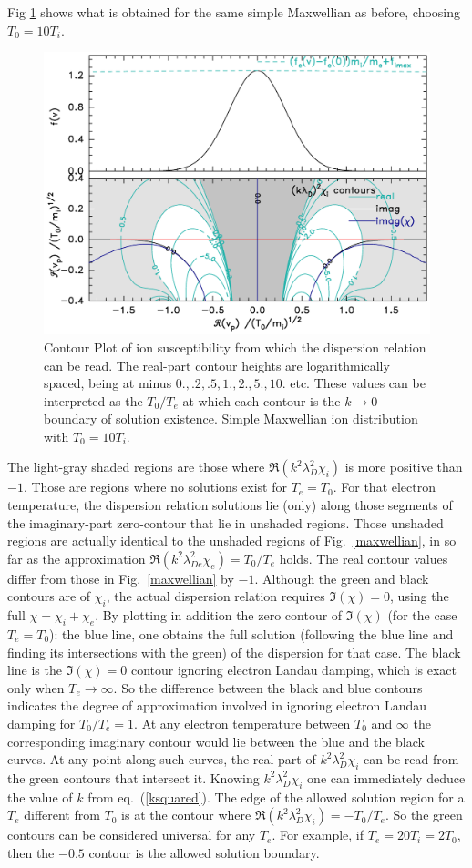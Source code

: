 \documentclass[12pt]{article}
\begin{document}
Fig \ref{maxwellion} shows what is obtained for the same
simple Maxwellian as before, choosing $T_0=10T_i$.
\begin{figure}[ht]
  \center\includegraphics[width=0.7\hsize]{maxwellion}\endcenter
  \caption{Contour Plot of ion susceptibility from which the
    dispersion relation can be read. The real-part contour heights are
    logarithmically spaced, being at minus $0.,.2,.5,1.,2.,5.,10.$
    etc. These values can be interpreted as the $T_0/T_e$ at which
    each contour is the $k\to 0$ boundary of solution existence.
    Simple Maxwellian ion distribution with
    $T_0=10T_i$.\label{maxwellion}}
\end{figure}
The light-gray shaded regions are those where
$\Re(k^2\lambda_D^2\chi_i)$ is more positive than $-1$. Those are
regions where no solutions exist for $T_e=T_0$. For that electron
temperature, the dispersion relation solutions lie (only) along those
segments of the imaginary-part zero-contour that lie in unshaded
regions. Those unshaded regions are actually identical to the unshaded
regions of Fig.\ \ref{maxwellian}, in so far as the approximation 
$\Re(k^2\lambda_{De}^2\chi_e)=T_0/T_e$ holds. The real contour values differ
from those in Fig.\ \ref{maxwellian} by $-1$. Although the green and black
contours are of $\chi_i$, the actual dispersion relation requires
$\Im(\chi)=0$, using the full $\chi=\chi_i+\chi_e$. By plotting in
addition the zero contour of $\Im(\chi)$ (for the case $T_e=T_0$): the
blue line, one obtains the full solution (following the blue line and
finding its intersections with the green) of the dispersion for that
case. The black line is the $\Im(\chi)=0$ contour ignoring electron
Landau damping, which is exact only when $T_e\to\infty$. So the
difference between the black and blue contours indicates the degree of
approximation involved in ignoring electron Landau damping for
$T_0/T_e=1$. At any electron temperature between $T_0$ and $\infty$
the corresponding imaginary contour would lie between the blue and the
black curves.  At any point along such curves, the real part of
$k^2\lambda_{D}^2 \chi_i$ can be read from the green contours that
intersect it. Knowing $k^2\lambda_{D}^2 \chi_i$ one can immediately
deduce the value of $k$ from eq.\ (\ref{ksquared}).
 The edge of the allowed
solution region for a $T_e$ different from $T_0$ is at the contour
where $\Re (k^2\lambda_{D}^2 \chi_i)=-T_0/T_e$. So the green contours
can be considered universal for any $T_e$. For example, if
$T_e=20T_i=2T_0$, then the $-0.5$ contour is the allowed solution
boundary.
\end{document}
